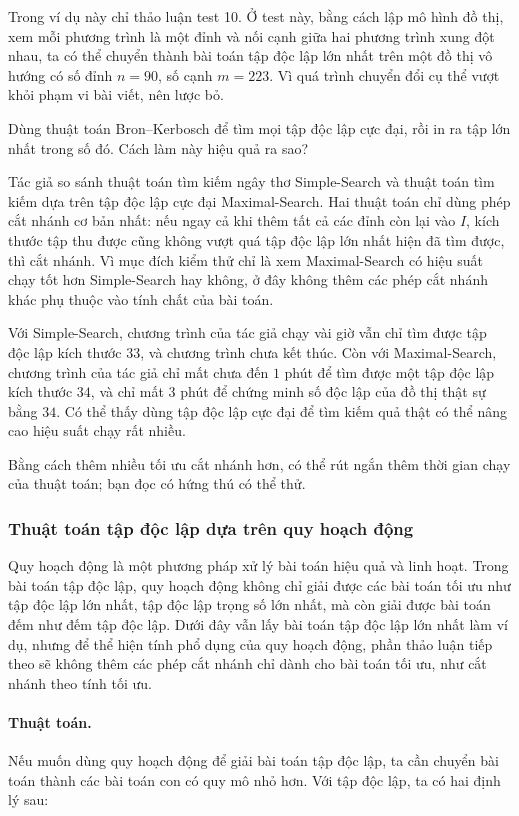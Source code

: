 \documentclass[11pt]{article}
\begin{document}
Trong ví dụ này chỉ thảo luận test 10. Ở test này, bằng cách lập mô hình đồ
thị, xem mỗi phương trình là một đỉnh và nối cạnh giữa hai phương trình xung
đột nhau, ta có thể chuyển thành bài toán tập độc lập lớn nhất trên một đồ thị
vô hướng có số đỉnh \(n=90\), số cạnh \(m=223\). Vì quá trình chuyển đổi cụ thể
vượt khỏi phạm vi bài viết, nên lược bỏ.

Dùng thuật toán Bron--Kerbosch để tìm mọi tập độc lập cực đại, rồi in ra tập
lớn nhất trong số đó. Cách làm này hiệu quả ra sao?

Tác giả so sánh thuật toán tìm kiếm ngây thơ Simple-Search và thuật toán tìm
kiếm dựa trên tập độc lập cực đại Maximal-Search. Hai thuật toán chỉ dùng phép
cắt nhánh cơ bản nhất: nếu ngay cả khi thêm tất cả các đỉnh còn lại vào \(I\),
kích thước tập thu được cũng không vượt quá tập độc lập lớn nhất hiện đã tìm
được, thì cắt nhánh. Vì mục đích kiểm thử chỉ là xem Maximal-Search có hiệu
suất chạy tốt hơn Simple-Search hay không, ở đây không thêm các phép cắt nhánh
khác phụ thuộc vào tính chất của bài toán.

Với Simple-Search, chương trình của tác giả chạy vài giờ vẫn chỉ tìm được tập
độc lập kích thước \(33\), và chương trình chưa kết thúc. Còn với
Maximal-Search, chương trình của tác giả chỉ mất chưa đến \(1\) phút để tìm
được một tập độc lập kích thước \(34\), và chỉ mất \(3\) phút để chứng minh số
độc lập của đồ thị thật sự bằng \(34\). Có thể thấy dùng tập độc lập cực đại để
tìm kiếm quả thật có thể nâng cao hiệu suất chạy rất nhiều.

Bằng cách thêm nhiều tối ưu cắt nhánh hơn, có thể rút ngắn thêm thời gian chạy
của thuật toán; bạn đọc có hứng thú có thể thử.

\subsubsection{Thuật toán tập độc lập dựa trên quy hoạch động}

Quy hoạch động là một phương pháp xử lý bài toán hiệu quả và linh hoạt. Trong
bài toán tập độc lập, quy hoạch động không chỉ giải được các bài toán tối ưu
như tập độc lập lớn nhất, tập độc lập trọng số lớn nhất, mà còn giải được bài
toán đếm như đếm tập độc lập. Dưới đây vẫn lấy bài toán tập độc lập lớn nhất
làm ví dụ, nhưng để thể hiện tính phổ dụng của quy hoạch động, phần thảo luận
tiếp theo sẽ không thêm các phép cắt nhánh chỉ dành cho bài toán tối ưu, như
cắt nhánh theo tính tối ưu.

\paragraph{Thuật toán.}
Nếu muốn dùng quy hoạch động để giải bài toán tập độc lập, ta cần chuyển bài
toán thành các bài toán con có quy mô nhỏ hơn. Với tập độc lập, ta có hai định
lý sau:
\end{document}
